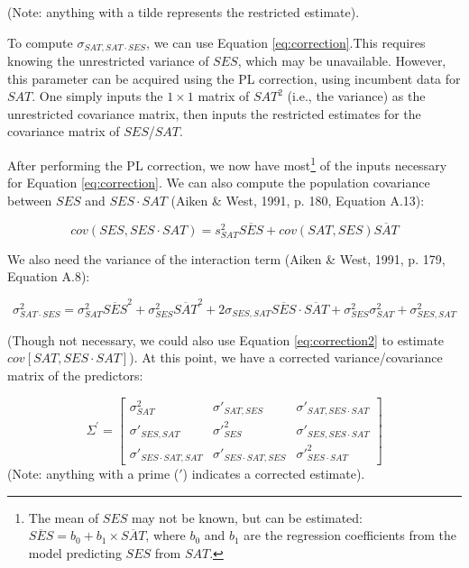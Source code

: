\documentclass[english,man]{apa6}
\theoremstyle{definition}
\theoremstyle{definition}
\theoremstyle{remark}
\begin{document}
\noindent (Note: anything with a tilde represents the restricted
estimate).

To compute \(\sigma_{SAT, SAT\cdot SES}\), we can use Equation
\ref{eq:correction}.This requires knowing the unrestricted variance of
\(SES\), which may be unavailable. However, this parameter can be
acquired using the PL correction, using incumbent data for \(SAT\). One
simply inputs the \(1\times1\) matrix of \(SAT^2\) (i.e., the variance)
as the unrestricted covariance matrix, then inputs the restricted
estimates for the covariance matrix of \(SES\)/\(SAT\).

After performing the PL correction, we now have most\footnote{The mean
  of \(SES\) may not be known, but can be estimated:
  \(\overline{SES} = b_0 + b_1\times \overline{SAT}\), where \(b_0\) and
  \(b_1\) are the regression coefficients from the model predicting
  \(SES\) from \(SAT\).} of the inputs necessary for Equation
\ref{eq:correction}. We can also compute the population covariance
between \(SES\) and \(SES \cdot SAT\) (Aiken \& West, 1991, p. 180,
Equation A.13):

\begin{equation}
cov(SES, SES\cdot SAT) = s^2_{SAT} \overline{SES} + cov(SAT, SES) \overline{SAT}
\label{eq:correction2}
\end{equation}

We also need the variance of the interaction term (Aiken \& West, 1991,
p. 179, Equation A.8):

\begin{equation}
\sigma^2_{SAT\cdot SES} = \sigma^2_{SAT}\overline{SES}^2 + \sigma^2_{SES}\overline{SAT}^2 + 2\sigma_{SES,SAT}\overline{SES}\cdot \overline{SAT} + \sigma^2_{SES}\sigma^2_{SAT} + \sigma^2_{SES,SAT}
\label{eq:correction3}
\end{equation}

(Though not necessary, we could also use Equation \ref{eq:correction2}
to estimate \(cov[SAT, SES\cdot SAT]\)). At this point, we have a
corrected variance/covariance matrix of the predictors:

\[
   \Sigma^\prime=
  \left[ {\begin{array}{ccc}
   \sigma^2_{SAT} & \sigma\prime_{SAT,{SES}} & \sigma\prime_{SAT,SES\cdot SAT} \\
    \sigma\prime_{SES,SAT} & \sigma\prime^2_{SES} & \sigma\prime_{SES,SES\cdot SAT} \\
    \sigma\prime_{SES\cdot SAT,SAT} &\sigma\prime_{SES\cdot SAT,SES} & \sigma\prime^2_{SES\cdot SAT}
  \end{array} } \right]
\] \label{eq:matrix} \noindent (Note: anything with a prime (\(\prime\))
indicates a corrected estimate).
\end{document}
